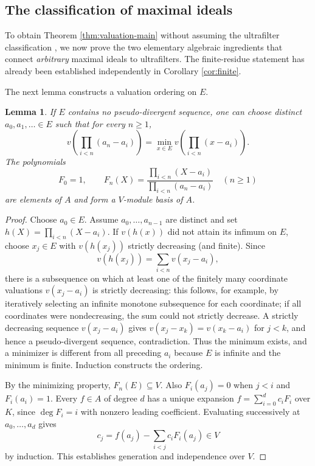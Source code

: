 \documentclass[11pt]{amsart}
\newtheorem{lemma}[theorem]{Lemma}
\theoremstyle{definition}
\theoremstyle{remark}
\begin{document}
\subsection{The classification of maximal ideals}\label{sec:classification}
To obtain Theorem \ref{thm:valuation-main} without assuming the ultrafilter classification \cite[Theorem~3.5]{BoulangerChabert2020}, we now prove the two elementary algebraic ingredients that connect \emph{arbitrary} maximal ideals to ultrafilters. The finite-residue statement has already been established independently in Corollary \ref{cor:finite}.


The next lemma constructs a valuation ordering on $E$.
\begin{lemma}\label{lem:ordering}
If $E$ contains no pseudo-divergent sequence, one can choose distinct $a_0,a_1,\ldots\in E$ such that for every $n\geq1$,
\[
 v\!\left(\prod_{i<n}(a_n-a_i)\right)
 =\min_{x\in E}v\!\left(\prod_{i<n}(x-a_i)\right).
 \tag{6.1}
\]
The polynomials
\[
 F_0=1,\qquad F_n(X)=\frac{\prod_{i<n}(X-a_i)}{\prod_{i<n}(a_n-a_i)}\quad(n\geq1)
\]
are elements of $A$ and form a $V$-module basis of $A$.
\end{lemma}
\begin{proof}
Choose $a_0\in E$. Assume $a_0,\ldots,a_{n-1}$ are distinct and set $h(X)=\prod_{i<n}(X-a_i)$. If $v(h(x))$ did not attain its infimum on $E$, choose $x_j\in E$ with $v(h(x_j))$ strictly decreasing (and finite). Since
\[
 v(h(x_j))=\sum_{i<n}v(x_j-a_i),
\]
there is a subsequence on which at least one of the finitely many coordinate valuations $v(x_j-a_i)$ is strictly decreasing: this follows, for example, by iteratively selecting an infinite monotone subsequence for each coordinate; if all coordinates were nondecreasing, the sum could not strictly decrease. A strictly decreasing sequence $v(x_j-a_i)$ gives $v(x_j-x_k)=v(x_k-a_i)$ for $j<k$, and hence a pseudo-divergent sequence, contradiction. Thus the minimum exists, and a minimizer is different from all preceding $a_i$ because $E$ is infinite and the minimum is finite. Induction constructs the ordering.

By the minimizing property, $F_n(E)\subseteq V$. Also $F_i(a_j)=0$ when $j<i$ and $F_i(a_i)=1$. Every $f\in A$ of degree $d$ has a unique expansion $f=\sum_{i=0}^d c_iF_i$ over $K$, since $\deg F_i=i$ with nonzero leading coefficient. Evaluating successively at $a_0,\ldots,a_d$ gives
\[
 c_j=f(a_j)-\sum_{i<j}c_iF_i(a_j)\in V
\]
by induction. This establishes generation and independence over $V$.
\end{proof}
\end{document}
